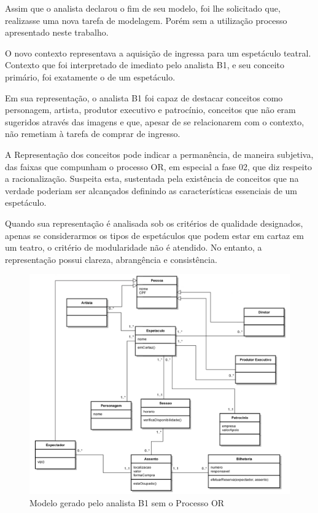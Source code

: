 Assim que o analista declarou o fim de seu modelo, foi lhe solicitado que, realizasse uma nova tarefa de modelagem. Porém sem a utilização processo apresentado neste trabalho.

O novo contexto representava a aquisição de ingressa para um espetáculo teatral. Contexto que foi interpretado de imediato pelo analista B1, e seu conceito primário, foi exatamente o de um espetáculo.

Em sua representação, o analista B1 foi capaz de destacar conceitos como personagem, artista, produtor executivo e patrocínio, conceitos que não eram sugeridos através das imagens e que, apesar de se relacionarem com o contexto, não remetiam à tarefa de comprar de ingresso.

A Representação dos conceitos pode indicar a permanência, de maneira subjetiva, das faixas que compunham o processo OR, em especial a fase 02, que diz respeito a racionalização. Suspeita esta, sustentada pela existência de conceitos que na verdade poderiam ser alcançados definindo as características essenciais de um espetáculo.

Quando sua representação é analisada sob os critérios de qualidade designados, apenas se considerarmos os tipos de espetáculos que podem estar em cartaz em um teatro, o critério de modularidade não é atendido. No entanto, a representação possui clareza, abrangência e consistência.

\begin{figure}[!ht]
    \centering
    \includegraphics[width=\textwidth]{imagens/Modelo_002_Igor.png}
    \caption{Modelo gerado pelo analista B1 sem o Processo OR}
    \label{fig:modeloB1002}
\end{figure}

